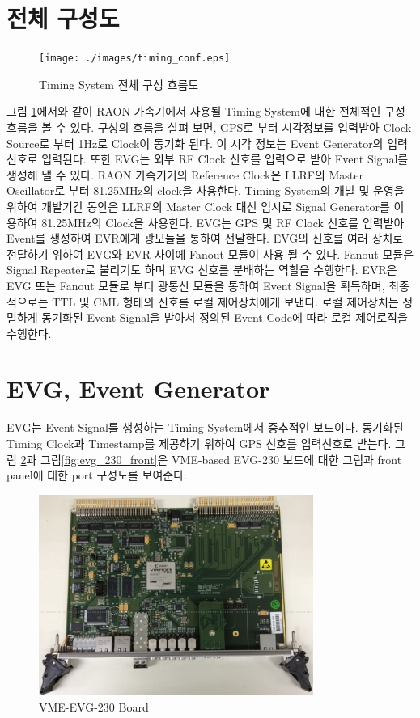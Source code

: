 \documentclass[11pt
  , a4paper
  , article
  , oneside
]{memoir}
\begin{document}
\section{전체 구성도}
\begin{figure}[h!]
	\centering
	\texttt{[image: ./images/timing\_conf.eps]}
	\caption{Timing System 전체 구성 흐름도}
	\label{fig:timing_conf} 
\end{figure}
 그림 \ref{fig:timing_conf}에서와 같이 RAON 가속기에서 사용될 Timing System에 대한 전체적인 구성 흐름을 볼 수 있다. 구성의 흐름을 살펴 보면, GPS로 부터 시각정보를 입력받아 Clock Source로 부터 1Hz로 Clock이 동기화 된다. 이 시각 정보는 Event Generator의 입력신호로 입력된다. 또한 EVG는 외부 RF Clock 신호를 입력으로 받아 Event Signal를 생성해 낼 수 있다. RAON 가속기기의 Reference Clock은 LLRF의 Master Oscillator로 부터 81.25MHz의 clock을 사용한다. Timing System의 개발 및 운영을 위하여 개발기간 동안은 LLRF의 Master Clock 대신 임시로 Signal Generator를 이용하여 81.25MHz의 Clock을 사용한다. EVG는 GPS 및 RF Clock 신호를 입력받아 Event를 생성하여 EVR에게 광모듈을 통하여 전달한다. EVG의 신호를 여러 장치로 전달하기 위하여 EVG와 EVR 사이에 Fanout 모듈이 사용 될 수 있다. Fanout 모듈은 Signal Repeater로 불리기도 하며 EVG 신호를 분배하는 역할을 수행한다. EVR은 EVG 또는 Fanout 모듈로 부터 광통신 모듈을 통하여 Event Signal을 획득하며, 최종적으로는 TTL 및 CML 형태의 신호를 로컬 제어장치에게 보낸다. 로컬 제어장치는 정밀하게 동기화된 Event Signal을 받아서 정의된 Event Code에 따라 로컬 제어로직을 수행한다. 
 
\section{EVG, Event Generator}
EVG는 Event Signal를 생성하는 Timing System에서 중추적인 보드이다. 동기화된 Timing Clock과 Timestamp를 제공하기 위하여 GPS 신호를 입력신호로 받는다. 그림 \ref{fig:evg_230_board}과 그림\ref{fig:evg_230_front}은 VME-based EVG-230 보드에 대한 그림과 front panel에 대한 port 구성도를 보여준다.

\begin{figure}[h!]
	\centering
	\includegraphics[width=0.8\textwidth]{./images/evg_230.eps}
	\caption{VME-EVG-230 Board}
	\label{fig:evg_230_board} 
\end{figure}
\end{document}
